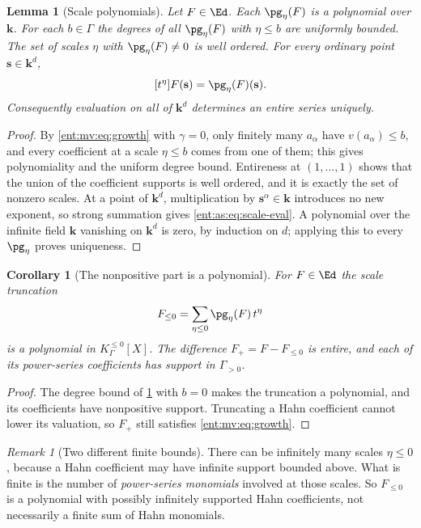 \documentclass[11pt]{article}
\theoremstyle{plain}
\newtheorem{lemma}[lemma]{Lemma}
\theoremstyle{plain}
\theoremstyle{plain}
\newtheorem{corollary}[corollary]{Corollary}
\theoremstyle{definition}
\theoremstyle{definition}
\theoremstyle{definition}
\theoremstyle{definition}
\theoremstyle{remark}
\newtheorem{remark}[remark]{Remark}
\newcommand{\kk}{\mathbf k}\newcommand{\PP}{\mathbb P}
\newcommand{\Kle}{K_\Gamma^{\le0}}\DeclareMathOperator{\Jac}{Jac}
\begin{document}
\begin{lemma}[Scale polynomials]\label{ent:as:lem:scale}
Let $F\in\Ed$. Each $\pg_\eta(F)$ is a polynomial over $\kk$. For each
$b\in\Gamma$ the degrees of all $\pg_\eta(F)$ with $\eta\le b$ are uniformly
bounded. The set of scales $\eta$ with $\pg_\eta(F)\ne0$ is well ordered. For
every ordinary point $\mathbf s\in\kk^d$,
\begin{equation}\label{ent:as:eq:scale-eval}
 [t^\eta]F(\mathbf s)=\pg_\eta(F)(\mathbf s).
\end{equation}
Consequently evaluation on all of $\kk^d$ determines an entire series
uniquely.
\end{lemma}
\begin{proof}
By \eqref{ent:mv:eq:growth} with $\gamma=0$, only finitely many $a_\alpha$ have
$v(a_\alpha)\le b$, and every coefficient at a scale $\eta\le b$ comes from one
of them; this gives polynomiality and the uniform degree bound. Entireness at
$(1,\ldots,1)$ shows that the union of the coefficient supports is well
ordered, and it is exactly the set of nonzero scales. At a point of $\kk^d$,
multiplication by $\mathbf s^\alpha\in\kk$ introduces no new exponent, so
strong summation gives \eqref{ent:as:eq:scale-eval}. A polynomial over the
infinite field $\kk$ vanishing on $\kk^d$ is zero, by induction on $d$;
applying this to every $\pg_\eta$ proves uniqueness.
\end{proof}

\begin{corollary}[The nonpositive part is a polynomial]
\label{ent:as:cor:truncation}
For $F\in\Ed$ the scale truncation
\[
 F_{\le0}=\sum_{\eta\le0}\pg_\eta(F)\,t^\eta
\]
is a polynomial in $\Kle[X]$. The difference $F_+=F-F_{\le0}$ is entire, and
each of its power-series coefficients has support in $\Gamma_{>0}$.
\end{corollary}
\begin{proof}
The degree bound of \cref{ent:as:lem:scale} with $b=0$ makes the truncation a
polynomial, and its coefficients have nonpositive support. Truncating a Hahn
coefficient cannot lower its valuation, so $F_+$ still satisfies
\eqref{ent:mv:eq:growth}.
\end{proof}

\begin{remark}[Two different finite bounds]\label{ent:as:rem:two-bounds}
There can be infinitely many scales $\eta\le0$, because a Hahn coefficient may
have infinite support bounded above. What is finite is the number of
\emph{power-series monomials} involved at those scales. So $F_{\le0}$ is a
polynomial with possibly infinitely supported Hahn coefficients, not
necessarily a finite sum of Hahn monomials.
\end{remark}
\end{document}
